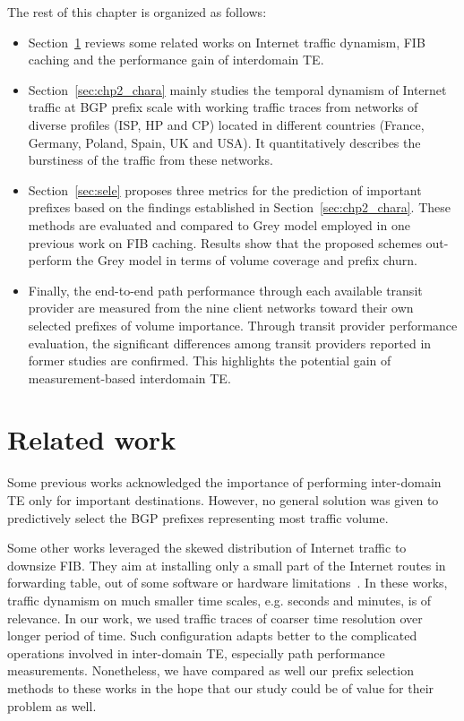 The rest of this chapter is organized as follows:
\begin{itemize}
\item Section~\ref{sec:chp2_related_work} reviews some related works on Internet traffic dynamism, \ac{FIB} caching and the performance gain of interdomain TE.
\item Section~\ref{sec:chp2_chara} mainly studies the temporal dynamism of Internet traffic at BGP prefix scale with working traffic traces from networks of diverse profiles (\ac{ISP}, \ac{HP} and \ac{CP}) located in different countries (France, Germany, Poland, Spain, UK and USA).
It quantitatively describes the burstiness of the traffic from these networks.
\item Section~\ref{sec:sele} proposes three metrics for the prediction of important prefixes based on the findings established in Section~\ref{sec:chp2_chara}. 
These methods are evaluated and compared to Grey model employed in one previous work on \ac{FIB} caching. 
Results show that the proposed schemes out-perform the Grey model in terms of volume coverage and prefix churn. 
\item Finally, the end-to-end path performance through each available transit provider are measured from the nine client networks toward their own selected prefixes of volume importance. 
Through transit provider performance evaluation, the significant differences among transit providers reported in former studies are confirmed.
This highlights the potential gain of measurement-based interdomain \ac{TE}.
\end{itemize}


\section{Related work}
\label{sec:chp2_related_work}
Some previous works \cite{Feamster2003, Akella2008, Goldenberg2004} acknowledged the importance of performing inter-domain TE only for important destinations.
However, no general solution was given to predictively select the BGP prefixes representing most traffic volume.

Some other works leveraged the skewed distribution of Internet traffic to downsize \ac{FIB}. 
They aim at installing only a small part of the Internet routes in forwarding table, out of some software or hardware limitations~\cite{Iannone2007, Ballani2009, Kim2009, Zhang2012, Sarrar2012, Liu2015}.
In these works, traffic dynamism on much smaller time scales, e.g. seconds and minutes, is of relevance. 
In our work, we used traffic traces of coarser time resolution over longer period of time.
Such configuration adapts better to the complicated operations involved in inter-domain TE, especially path performance measurements.
Nonetheless, we have compared as well our prefix selection methods to these works in the hope that our study could be of value for their problem as well. 

